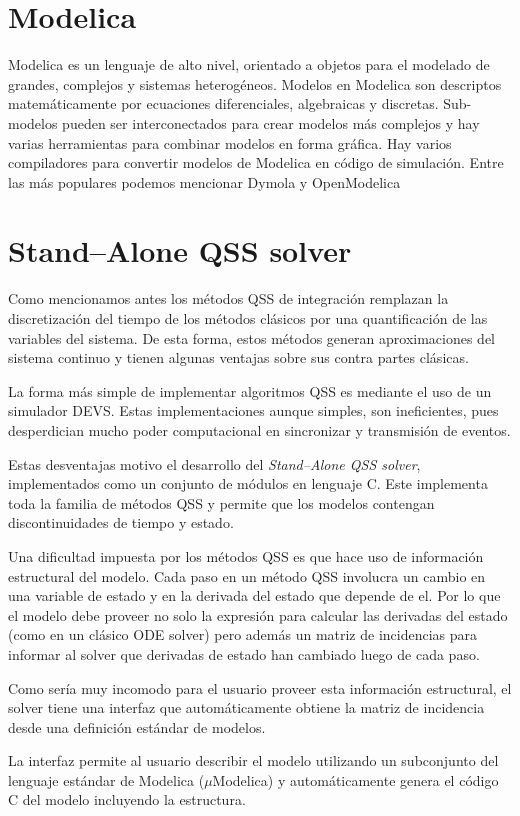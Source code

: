 \documentclass[a4paper,	11pt]{report}
\begin{document}
\section{Modelica}
Modelica es un lenguaje de alto nivel, orientado a objetos para el modelado de grandes, complejos y sistemas heterogéneos.
Modelos en Modelica son descriptos matemáticamente por ecuaciones diferenciales, algebraicas y discretas. Sub-modelos pueden ser interconectados para crear modelos más complejos y hay varias herramientas para combinar modelos en forma gráfica. 
Hay varios compiladores para convertir modelos de Modelica en código de simulación. Entre las más populares podemos mencionar Dymola y OpenModelica

\section{Stand–Alone QSS solver}
Como mencionamos antes los métodos QSS de integración remplazan la discretización del tiempo de los métodos clásicos por una quantificación de las variables del sistema. De esta forma, estos métodos generan aproximaciones del sistema continuo y tienen algunas ventajas sobre sus contra partes clásicas.

La forma más simple de implementar algoritmos QSS es mediante el uso de un simulador DEVS. Estas implementaciones aunque simples, son ineficientes, pues desperdician mucho poder computacional en sincronizar y transmisión de eventos.

Estas desventajas motivo el desarrollo del \emph{Stand–Alone QSS solver}, implementados como un conjunto de módulos en lenguaje C. Este implementa toda la familia de métodos QSS y permite que los modelos contengan discontinuidades de tiempo y estado.

Una dificultad impuesta por los métodos QSS es que hace uso de información estructural del modelo. Cada paso en un método QSS involucra un cambio en una variable de estado y en la derivada del estado que depende de el. Por lo que el modelo debe proveer no solo la expresión para calcular las derivadas del estado (como en un clásico ODE solver) pero además un matriz de incidencias para informar al solver que derivadas de estado han cambiado luego de cada paso.

Como sería muy incomodo para el usuario proveer esta información estructural, el solver tiene una interfaz que automáticamente obtiene la matriz de incidencia desde una definición estándar de modelos.

La interfaz permite al usuario describir el modelo utilizando un subconjunto del lenguaje estándar de Modelica ($\mu$Modelica) y automáticamente genera el código C del modelo incluyendo la estructura.
\end{document}
